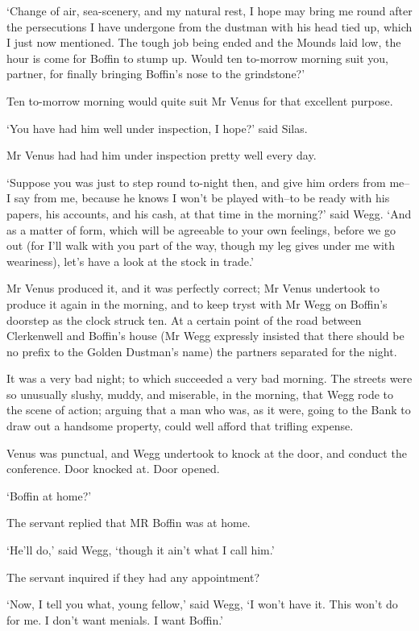 ‘Change of air, sea-scenery, and my natural rest, I hope may bring me
round after the persecutions I have undergone from the dustman with his
head tied up, which I just now mentioned. The tough job being ended and
the Mounds laid low, the hour is come for Boffin to stump up. Would ten
to-morrow morning suit you, partner, for finally bringing Boffin’s nose
to the grindstone?’

Ten to-morrow morning would quite suit Mr Venus for that excellent
purpose.

‘You have had him well under inspection, I hope?’ said Silas.

Mr Venus had had him under inspection pretty well every day.

‘Suppose you was just to step round to-night then, and give him orders
from me--I say from me, because he knows I won’t be played with--to be
ready with his papers, his accounts, and his cash, at that time in the
morning?’ said Wegg. ‘And as a matter of form, which will be agreeable
to your own feelings, before we go out (for I’ll walk with you part of
the way, though my leg gives under me with weariness), let’s have a look
at the stock in trade.’

Mr Venus produced it, and it was perfectly correct; Mr Venus undertook
to produce it again in the morning, and to keep tryst with Mr Wegg on
Boffin’s doorstep as the clock struck ten. At a certain point of the
road between Clerkenwell and Boffin’s house (Mr Wegg expressly insisted
that there should be no prefix to the Golden Dustman’s name) the
partners separated for the night.

It was a very bad night; to which succeeded a very bad morning. The
streets were so unusually slushy, muddy, and miserable, in the morning,
that Wegg rode to the scene of action; arguing that a man who was, as
it were, going to the Bank to draw out a handsome property, could well
afford that trifling expense.

Venus was punctual, and Wegg undertook to knock at the door, and conduct
the conference. Door knocked at. Door opened.

‘Boffin at home?’

The servant replied that MR Boffin was at home.

‘He’ll do,’ said Wegg, ‘though it ain’t what I call him.’

The servant inquired if they had any appointment?

‘Now, I tell you what, young fellow,’ said Wegg, ‘I won’t have it. This
won’t do for me. I don’t want menials. I want Boffin.’

